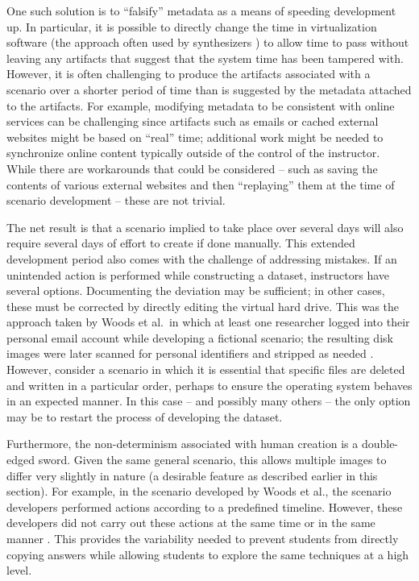 \documentclass[letterpaper,12pt]{report}
\begin{document}
One such solution is to ``falsify'' metadata as a means of speeding
development up. In particular, it is possible to directly change the
time in virtualization software (the approach often used by synthesizers
\cite{gobelForTraceHolisticForensic2022,mochForensicImageGenerator2009})
to allow time to pass without leaving any artifacts that suggest that
the system time has been tampered with. However, it is often challenging
to produce the artifacts associated with a scenario over a shorter
period of time than is suggested by the metadata attached to the
artifacts. For example, modifying metadata to be consistent with online
services can be challenging since artifacts such as emails or cached
external websites might be based on ``real'' time; additional work might
be needed to synchronize online content typically outside of the control
of the instructor. While there are workarounds that could be considered
-- such as saving the contents of various external websites and then
``replaying'' them at the time of scenario development -- these are not
trivial.

The net result is that a scenario implied to take place over several
days will also require several days of effort to create if done
manually. This extended development period also comes with the challenge
of addressing mistakes. If an unintended action is performed while
constructing a dataset, instructors have several options. Documenting
the deviation may be sufficient; in other cases, these must be corrected
by directly editing the virtual hard drive. This was the approach taken
by Woods et al.~in which at least one researcher logged into their
personal email account while developing a fictional scenario; the
resulting disk images were later scanned for personal identifiers and
stripped as needed \cite{woodsCreatingRealisticCorpora2011}.
However, consider a scenario in which it is essential that specific
files are deleted and written in a particular order, perhaps to ensure
the operating system behaves in an expected manner. In this case -- and
possibly many others -- the only option may be to restart the process of
developing the dataset.

Furthermore, the non-determinism associated with human creation is a
double-edged sword. Given the same general scenario, this allows
multiple images to differ very slightly in nature (a desirable feature
as described earlier in this section). For example, in the scenario
developed by Woods et al., the scenario developers performed actions
according to a predefined timeline. However, these developers did not
carry out these actions at the same time or in the same manner
\cite{woodsCreatingRealisticCorpora2011}. This provides the
variability needed to prevent students from directly copying answers
while allowing students to explore the same techniques at a high level.
\end{document}

